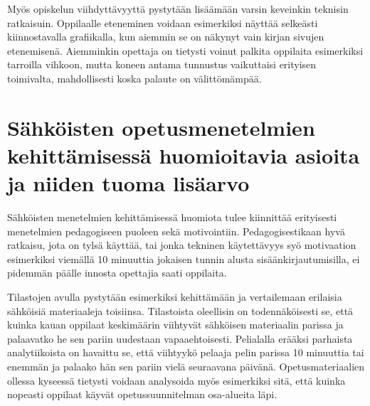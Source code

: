 \documentclass[utf8,bachelor]{gradu3}
\begin{document}
Myös opiskelun viihdyttävyyttä pystytään lisäämään varsin keveinkin teknisin ratkaisuin. Oppilaalle eteneminen voidaan esimerkiksi näyttää selkeästi kiinnostavalla grafiikalla, kun aiemmin se on näkynyt vain kirjan sivujen etenemisenä. Aiemminkin opettaja on tietysti voinut palkita oppilaita esimerkiksi tarroilla vihkoon, mutta koneen antama tunnustus vaikuttaisi erityisen toimivalta, mahdollisesti koska palaute on välittömämpää.

\section{Sähköisten opetusmenetelmien kehittämisessä huomioitavia asioita ja niiden tuoma lisäarvo}
Sähköisten menetelmien kehittämisessä huomiota tulee kiinnittää erityisesti menetelmien pedagogiseen puoleen sekä motivointiin. Pedagogisestikaan hyvä ratkaisu, jota on tylsä käyttää, tai jonka tekninen käytettävyys syö motivaation esimerkiksi viemällä 10 minuuttia jokaisen tunnin alusta sisäänkirjautumisilla, ei pidemmän päälle innosta opettajia saati oppilaita.


Tilastojen avulla pystytään esimerkiksi kehittämään ja vertailemaan erilaisia sähköisiä materiaaleja toisiinsa. Tilastoista oleellisin on todennäköisesti se, että kuinka kauan oppilaat keskimäärin viihtyvät sähköisen materiaalin parissa ja palaavatko he sen pariin uudestaan vapaaehtoisesti. Pelialalla erääksi parhaista analytiikoista on havaittu se, että viihtyykö pelaaja pelin parissa 10 minuuttia tai enemmän ja palaako hän sen pariin vielä seuraavana päivänä. Opetusmateriaalien ollessa kyseessä tietysti voidaan analysoida myös esimerkiksi sitä, että kuinka nopeasti oppilaat käyvät opetussuunnitelman osa-alueita läpi.
 


\end{document}
